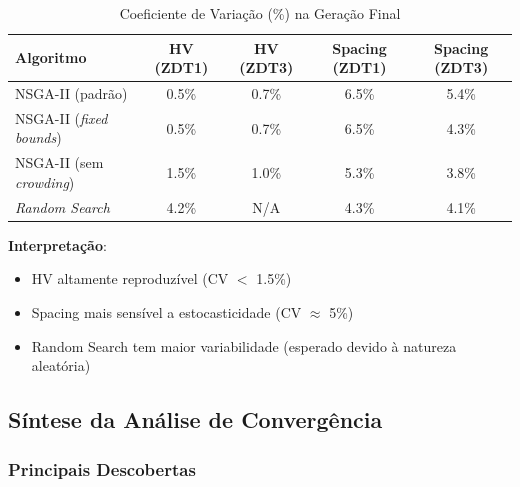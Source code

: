 \begin{table}[H]
\centering
\caption{Coeficiente de Variação (\%) na Geração Final}
\label{tab:cv_analysis}
\begin{tabular}{@{}lcccc@{}}
\toprule
\textbf{Algoritmo} & \textbf{HV (ZDT1)} & \textbf{HV (ZDT3)} & \textbf{Spacing (ZDT1)} & \textbf{Spacing (ZDT3)} \\
\midrule
NSGA-II (padrão) & 0.5\% & 0.7\% & 6.5\% & 5.4\% \\
NSGA-II (\textit{fixed bounds}) & 0.5\% & 0.7\% & 6.5\% & 4.3\% \\
NSGA-II (sem \textit{crowding}) & 1.5\% & 1.0\% & 5.3\% & 3.8\% \\
\textit{Random Search} & 4.2\% & N/A & 4.3\% & 4.1\% \\
\bottomrule
\end{tabular}
\end{table}

\textbf{Interpretação}:
\begin{itemize}
    \item HV altamente reproduzível (CV $<$ 1.5\%)
    \item Spacing mais sensível a estocasticidade (CV $\approx$ 5\%)
    \item Random Search tem maior variabilidade (esperado devido à natureza aleatória)
\end{itemize}

\subsection{Síntese da Análise de Convergência}

\subsubsection{Principais Descobertas}

